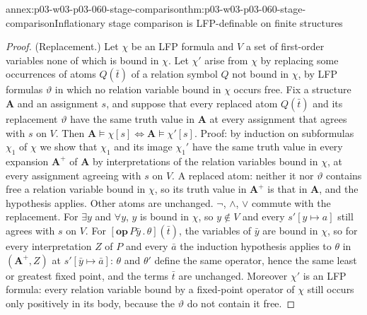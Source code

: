 \begin{annexitem}{annex:p03-w03-p03-060-stage-comparison}{thm:p03-w03-p03-060-stage-comparison}{Inflationary stage comparison is LFP-definable on finite structures}
\begin{proof}
(Replacement.) Let \(\chi\) be an LFP formula and \(V\) a set of
first-order variables none of which is bound in \(\chi\). Let \(\chi'\)
arise from \(\chi\) by replacing some occurrences of atoms \(Q(\bar t)\) of
a relation symbol \(Q\) not bound in \(\chi\), by LFP formulas
\(\vartheta\) in which no relation
variable bound in \(\chi\) occurs free. Fix a structure \(\mathbf A\) and
an assignment \(s\), and suppose that every replaced atom \(Q(\bar t)\) and
its replacement \(\vartheta\) have the same truth value in \(\mathbf A\) at
every assignment that agrees with \(s\) on \(V\). Then
\(\mathbf A\models\chi[s]\iff\mathbf A\models\chi'[s]\). Proof: by
induction on subformulas \(\chi_1\) of \(\chi\) we show that \(\chi_1\) and
its image \(\chi_1'\) have the same truth value in every expansion
\(\mathbf A^+\) of \(\mathbf A\) by interpretations of the relation
variables bound in \(\chi\), at every assignment agreeing with \(s\) on
\(V\). A replaced atom: neither it nor \(\vartheta\) contains free a
relation variable bound in \(\chi\), so its truth value in \(\mathbf A^+\)
is that in \(\mathbf A\), and the hypothesis applies. Other atoms are
unchanged. \(\neg\), \(\wedge\), \(\vee\) commute with the replacement.
For \(\exists y\) and \(\forall y\), \(y\) is bound in \(\chi\), so
\(y\notin V\) and every \(s'[y\mapsto a]\) still agrees with \(s\) on
\(V\). For \([\mathbf{op}\,P\bar y\,.\,\theta](\bar t)\), the variables of
\(\bar y\) are bound in \(\chi\), so for every interpretation \(Z\) of
\(P\) and every \(\bar a\) the induction hypothesis applies to \(\theta\)
in \((\mathbf A^+,Z)\) at \(s'[\bar y\mapsto\bar a]\): \(\theta\) and
\(\theta'\) define the same operator, hence the same least or greatest
fixed point, and the terms \(\bar t\) are unchanged. Moreover \(\chi'\) is
an LFP formula: every relation variable bound by a fixed-point operator of
\(\chi\) still occurs only positively in its body, because the
\(\vartheta\) do not contain it free.


\end{proof}
\end{annexitem}
